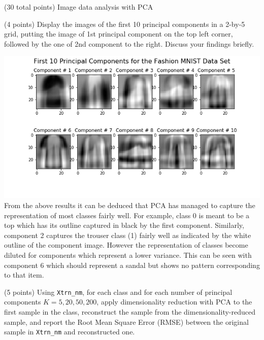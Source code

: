 \documentclass[12pt]{article}
\begin{document}
\begin{question}{(30 total points) Image data analysis with PCA}
\begin{subquestion}
   \end{subquestion}

   \begin{subquestion}{(4 points)
      Display the images of the first 10 principal components in
      a 2-by-5 grid, putting the image of 1st principal component on
      the top left corner, followed by the one of 2nd component to the right.
      Discuss your findings briefly.
     } \label{Q1.disp.pca}
   

      \begin{answerbox}{35em}
         \includegraphics[width = 1.0\textwidth]{q1_5.png}
         From the above results it can be deduced that PCA has managed to capture the representation of most classes fairly well. For example, class 0 is meant to be a top which has its outline captured in black by the first component. Similarly, component 2 captures the trouser class (1) fairly well as indicated by the white outline of the component image. However the representation of classes become diluted for components which represent a lower variance. This can be seen with component 6 which should represent a sandal but shows no pattern corresponding to that item.
         
      \end{answerbox}
  


   \end{subquestion}

   \begin{subquestion}{(5 points)
       Using \texttt{Xtrn\_nm}, 
       for each class and for each number of principal components $K =
       5, 20, 50, 200$, apply dimensionality reduction with PCA to the
       first sample in the class, reconstruct the sample from the
       dimensionality-reduced sample, and 
       report the Root Mean Square Error (RMSE) between the
       original sample in {\tt Xtrn\_nm} and reconstructed one.
     } \label{Q1.6}


\end{subquestion}
\end{question}
\end{document}
